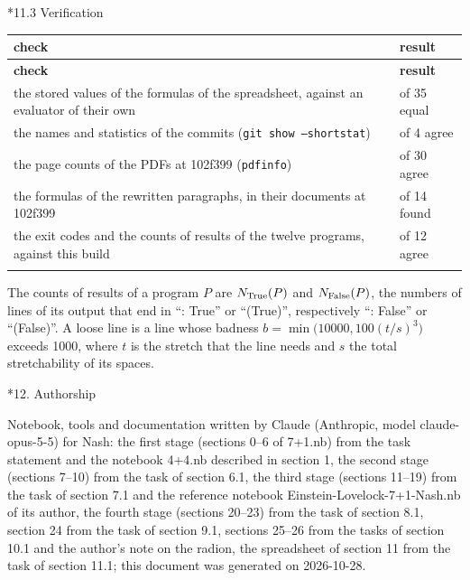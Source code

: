 \documentclass[10pt,a4paper]{article}
\makeatletter
\renewcommand\section{\@startsection{section}{1}{\z@}{-3.5ex \@plus -1ex \@minus -.2ex}{2.3ex \@plus.2ex}{\normalfont\Large\bfseries\raggedright}}
\renewcommand\subsection{\@startsection{subsection}{2}{\z@}{-3.25ex\@plus -1ex \@minus -.2ex}{1.5ex \@plus .2ex}{\normalfont\large\bfseries\raggedright}}
\makeatother
\begin{document}
\subsection*{11.3 Verification}
{\footnotesize
\begin{longtable}{>{\raggedright\arraybackslash}p{}>{\raggedright\arraybackslash}p{}}
\toprule
\textbf{check} & \textbf{result} \\
\midrule\endfirsthead
\toprule
\textbf{check} & \textbf{result} \\
\midrule\endhead
\endfoot
\bottomrule\endlastfoot
the stored values of the formulas of the spreadsheet, against an evaluator of their own & 35 of 35 equal \\
the names and statistics of the commits (\texttt{git show --shortstat}) & 4 of 4 agree \\
the page counts of the PDFs at 102f399 (\texttt{pdfinfo}) & 30 of 30 agree \\
the formulas of the rewritten paragraphs, in their documents at 102f399 & 14 of 14 found \\
the exit codes and the counts of results of the twelve programs, against this build & 12 of 12 agree \\*
\end{longtable}}
The counts of results of a program $P$ are $N_{\rm True}(P)$ and $N_{\rm False}(P)$, the numbers of lines of its output that end in “: True” or “(True)”, respectively “: False” or “(False)”. A loose line is a line whose badness $b=\min\big(10000,100(t/s)^3\big)$ exceeds 1000, where $t$ is the stretch that the line needs and $s$ the total stretchability of its spaces.

\section*{12. Authorship}
Notebook, tools and documentation written by Claude (Anthropic, model claude-opus-5-5) for Nash: the first stage (sections 0–6 of 7+1.nb) from the task statement and the notebook 4+4.nb described in section 1, the second stage (sections 7–10) from the task of section 6.1, the third stage (sections 11–19) from the task of section 7.1 and the reference notebook Einstein-Lovelock-7+1-Nash.nb of its author, the fourth stage (sections 20–23) from the task of section 8.1, section 24 from the task of section 9.1, sections 25–26 from the tasks of section 10.1 and the author’s note on the radion, the spreadsheet of section 11 from the task of section 11.1; this document was generated on 2026-10-28.
\end{document}
